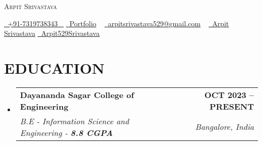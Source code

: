 \documentclass[letterpaper,11pt]{article}
\makeatletter
\newcommand{\resumeSubheading}[4]{
  \vspace{-2pt}\item
    \begin{tabular*}{1.0\textwidth}[t]{l@{\extracolsep{\fill}}r}
      \textbf{\large#1} & \textbf{\small #2} \\
      \textit{\large#3} & \textit{\small #4} \\
      
    \end{tabular*}\vspace{-7pt}
}
\newcommand{\resumeSubHeadingListStart}{\begin{itemize}[leftmargin=0.0in, label={}]}
\newcommand{\resumeSubHeadingListEnd}{\end{itemize}}
\makeatother
\begin{document}


\begin{center}
    {\Huge \scshape Arpit Srivastava} \\ \vspace{1pt}
   
    \small \href{tel:+xxxxxxxxxxxx}{ \raisebox{-0.1\height}\faPhone\ \underline{+91-7319738343} ~}
    \href{https://arpit529srivastava.tech/}{\raisebox{-0.1\height}\faGlobe\ \underline{Portfolio}} ~
    \hspace{8pt} %
    \href{mailto:arpitsrivastava529@gmail.com}{\raisebox{-0.2\height}\faEnvelope\  \underline{arpitsrivastava529@gmail.com}} ~ 
    \href{https://www.linkedin.com/in/arpitsrivastava529/}{\raisebox{-0.2\height}\faLinkedinSquare\ \underline{Arpit Srivastava}} 
    \hspace{10pt} %
    \href{https://github.com/arpit529srivastava}{\raisebox{-0.2\height}\faGithubSquare\ \underline{Arpit529Srivastava}}
\end{center}
\vspace{-12pt}
\section{EDUCATION}
  \resumeSubHeadingListStart
    \resumeSubheading
      {Dayananda Sagar College of Engineering}{OCT 2023 -- PRESENT}
      {B.E - Information Science and Engineering -  \textbf{8.8 CGPA}}{Bangalore, India}
    
  \resumeSubHeadingListEnd
 \vspace{-14pt}
  


        
               
\end{document}
